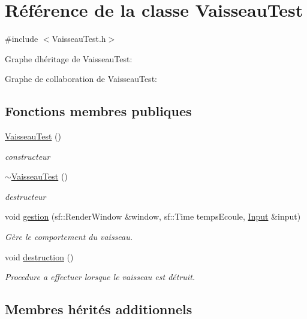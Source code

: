 \hypertarget{class_vaisseau_test}{}\section{Référence de la classe Vaisseau\+Test}
\label{class_vaisseau_test}


{\ttfamily \#include $<$Vaisseau\+Test.\+h$>$}



Graphe d\textquotesingle{}héritage de Vaisseau\+Test\+:


Graphe de collaboration de Vaisseau\+Test\+:
\subsection*{Fonctions membres publiques}
\begin{DoxyCompactItemize}
\item 
\hyperlink{class_vaisseau_test_acbe01fc8952d9c6fd52cbf311a92c903}{Vaisseau\+Test} ()
\begin{DoxyCompactList}\small\item\em constructeur \end{DoxyCompactList}\item 
\hyperlink{class_vaisseau_test_ada9b5788bc092ecede953248cd6133e8}{$\sim$\+Vaisseau\+Test} ()
\begin{DoxyCompactList}\small\item\em destructeur \end{DoxyCompactList}\item 
void \hyperlink{class_vaisseau_test_a83da402707d73465178b4e654d2e054a}{gestion} (sf\+::\+Render\+Window \&window, sf\+::\+Time temps\+Ecoule, \hyperlink{_input_8h_a5588d60d674991c719a8df848313e966}{Input} \&input)
\begin{DoxyCompactList}\small\item\em Gère le comportement du vaisseau. \end{DoxyCompactList}\item 
void \hyperlink{class_vaisseau_test_a5b8b67886ecb73d8f720f8499ef3c378}{destruction} ()
\begin{DoxyCompactList}\small\item\em Procedure a effectuer lorsque le vaisseau est détruit. \end{DoxyCompactList}\end{DoxyCompactItemize}
\subsection*{Membres hérités additionnels}


